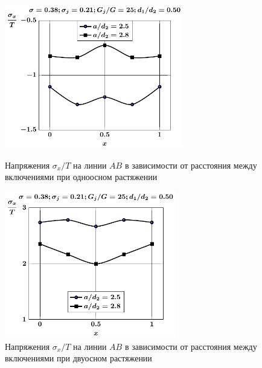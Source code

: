 \begin{figure}[h!]
\centering\footnotesize
\parbox[b]{7.5cm}{\centering\includegraphics[width=7.8cm]{oblate-inc8-a-d50-g25-t1-sig_x.pdf}
\caption{Напряжения $\sigma_x/T$ на линии $AB$ в зависимости от расстояния между включениями при одноосном растяжении
\label{f:10:14}}}\hfil\hfil
\parbox[b]{7.5cm}{\centering\includegraphics[width=7.5cm]{oblate-inc8-a-d50-g25-t2-sig_x.pdf}
\caption{Напряжения $\sigma_x/T$ на линии $AB$ в зависимости от расстояния между включениями при двуосном растяжении
\label{f:10:15}}}
\end{figure}

